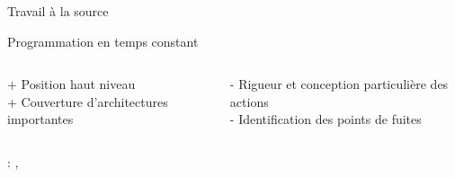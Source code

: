 \documentclass{backend/backend}
\begin{document}
\begin{frame}{Travail à la source}
        \centering

    \vfill
    \begin{blockSimple}{Programmation en temps constant}
        \begin{columns}
            \begin{column}{0.3\textwidth}
                + Position haut niveau\\
                + Couverture d'architectures importantes
            \end{column}
            \begin{column}{0.5\textwidth}
            - Rigueur et conception particulière des actions\\
            - Identification des points de fuites
            \end{column}
        \end{columns}        
    \end{blockSimple}

     : \citeauthor{schneider2024breakingbadcompilersbreak}, 
\end{frame}
\end{document}
